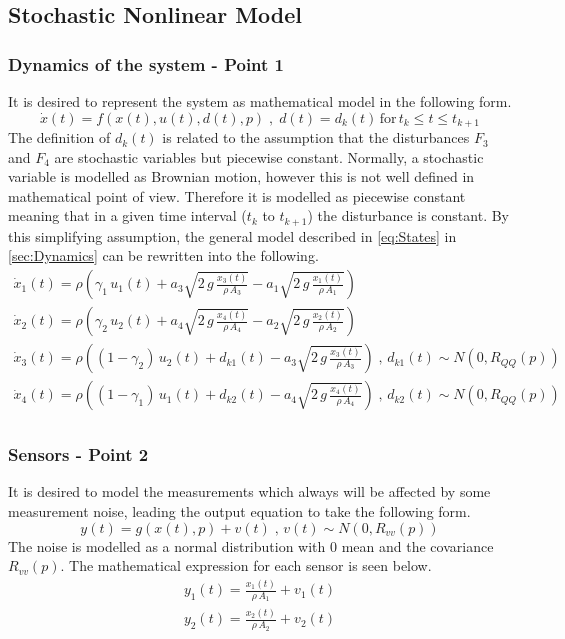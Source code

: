\subsection{Stochastic Nonlinear Model}
\label{sec:Stoc_Model}
\subsubsection{Dynamics of the system - Point 1}
It is desired to represent the system as mathematical model in the following form.
\begin{equation}
    \dot{x}(t)=f(x(t),u(t),d(t),p)\;,\;d(t)=d_k(t)\,\text{for}\,t_k\leq
    t\leq t_{k+1}
\end{equation}
The definition of $d_k(t)$ is related to the assumption that the disturbances $F_3$ and $F_4$ are stochastic variables but piecewise constant. Normally, a stochastic variable is modelled as Brownian motion, however this is not well defined in mathematical point of view. Therefore it is modelled as piecewise constant meaning that in a given time interval ($t_k$ to $t_{k+1}$) the disturbance is constant. By this simplifying assumption, the general model described in \cref{eq:States} in \cref{sec:Dynamics} can be rewritten into the following. \begin{equation}
    \begin{gathered}
        \dot{x}_1(t)=\rho\left(\gamma_1\,u_1(t)+a_3\sqrt{2\,g\,\frac{x_3(t)}{\rho\,A_3}}-a_1\sqrt{2\,g\,\frac{x_1(t)}{\rho\,A_1}}\right)\\
        \dot{x}_2(t)=\rho\left(\gamma_2\,u_2(t)+a_4\sqrt{2\,g\,\frac{x_4(t)}{\rho\,A_4}}-a_2\sqrt{2\,g\,\frac{x_2(t)}{\rho\,A_2}}\right)\\
        \dot{x}_3(t)=\rho\left((1-\gamma_2)\,u_2(t)+d_{k1}(t)-a_3\sqrt{2\,g\,\frac{x_3(t)}{\rho\,A_3}}\right)\;,\,d_{k1}(t)\sim N(0,R_{QQ}(p))\\
        \dot{x}_4(t)=\rho\left((1-\gamma_1)\,u_1(t)+d_{k2}(t)-a_4\sqrt{2\,g\,\frac{x_4(t)}{\rho\,A_4}}\right)\;,\,d_{k2}(t)\sim N(0,R_{QQ}(p))\\
    \end{gathered}
    \label{eq:stoc_states}
\end{equation}

\subsubsection{Sensors - Point 2}
It is desired to model the measurements which always will be affected by some measurement noise, leading the output equation to take the following form.
\begin{equation}
    y(t)=g(x(t),p)+v(t)\;,\,v(t)\sim N(0,R_{vv}(p))
\end{equation}
The noise is modelled as a normal distribution with 0 mean and the covariance $R_{vv}(p)$. The mathematical expression for each sensor is seen below.
\begin{equation}
    \begin{gathered}
        y_1(t)=\frac{x_1(t)}{\rho\,A_1}+v_1(t)\\
        y_2(t)=\frac{x_2(t)}{\rho\,A_2}+v_2(t)
    \end{gathered}
\end{equation}


